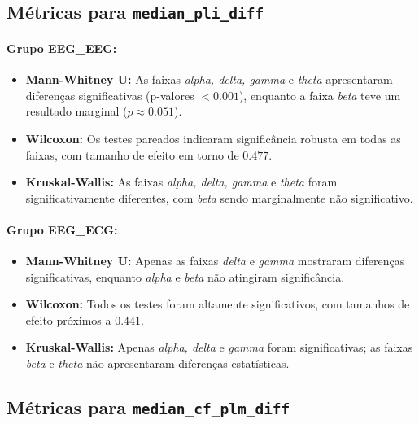 \subsection{\texorpdfstring{Métricas para \texttt{median\_pli\_diff}}{Métricas para median\_pli\_diff}}
\paragraph{Grupo EEG\_EEG:}
\begin{itemize}
    \item \textbf{Mann-Whitney U:} As faixas \emph{alpha, delta, gamma} e \emph{theta} apresentaram diferenças significativas (p-valores $< 0.001$), enquanto a faixa \emph{beta} teve um resultado marginal ($p \approx 0.051$).
    \item \textbf{Wilcoxon:} Os testes pareados indicaram significância robusta em todas as faixas, com tamanho de efeito em torno de $0.477$.
    \item \textbf{Kruskal-Wallis:} As faixas \emph{alpha, delta, gamma} e \emph{theta} foram significativamente diferentes, com \emph{beta} sendo marginalmente não significativo.
\end{itemize}

\paragraph{Grupo EEG\_ECG:}
\begin{itemize}
    \item \textbf{Mann-Whitney U:} Apenas as faixas \emph{delta} e \emph{gamma} mostraram diferenças significativas, enquanto \emph{alpha} e \emph{beta} não atingiram significância.
    \item \textbf{Wilcoxon:} Todos os testes foram altamente significativos, com tamanhos de efeito próximos a $0.441$.
    \item \textbf{Kruskal-Wallis:} Apenas \emph{alpha, delta} e \emph{gamma} foram significativas; as faixas \emph{beta} e \emph{theta} não apresentaram diferenças estatísticas.
\end{itemize}

\subsection{\texorpdfstring{Métricas para \texttt{median\_cf\_plm\_diff}}{Métricas para median\_cf\_plm\_diff}}
